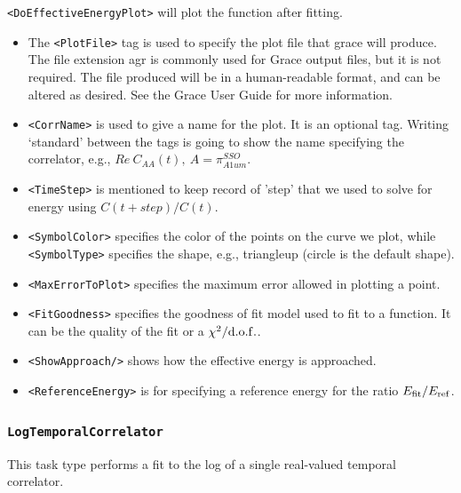 \documentclass[12pt]{article}
\newcommand{\vb}{\texttt}
\begin{document}
\vb{<DoEffectiveEnergyPlot>} will plot the function after fitting.

\begin{itemize}
\item The \vb{<PlotFile>} tag is used to specify the plot file that grace will produce. The file
  extension agr is commonly used for Grace output files, but it is not required. The file produced
  will be in a human-readable format, and can be altered as desired. See the Grace User Guide
  for more information.

\item \vb{<CorrName>} is used to give a name for the plot. It is an optional tag. Writing `standard'
  between the tags is going to show the name specifying the correlator,
  e.g., $Re \: C_{AA}(t),\: A = \pi_{A1um}^{SSO}$.

\item \vb{<TimeStep>} is mentioned to keep record of 'step' that we used to solve for energy
  using $C(t+step)/C(t)$.

\item \vb{<SymbolColor>} specifies the color of the points on the curve we plot, while \vb{<SymbolType>}
  specifies the shape, e.g., triangleup (circle is the default shape).

\item \vb{<MaxErrorToPlot>} specifies the maximum error allowed in plotting a point.

\item \vb{<FitGoodness>} specifies the goodness of fit model used to fit to a function. It can be the
  quality of the fit or a $\chi^2/{\rm d.o.f.}$.

\item \vb{<ShowApproach/>} shows how the effective energy is approached.

\item \vb{<ReferenceEnergy>} is for specifying a reference energy for the ratio $E_{\rm fit}/E_{\rm ref}$.
\end{itemize}

\subsubsection{\vb{LogTemporalCorrelator}}

This task type performs a fit to the log of a single real-valued temporal correlator.              
\end{document}
